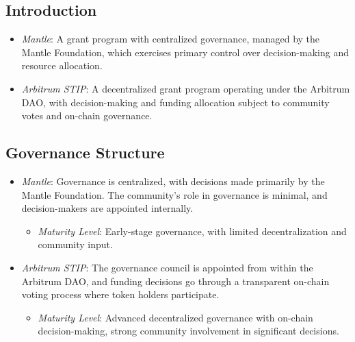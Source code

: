 \documentclass[a4,10pt]{article}
\begin{document}
\subsection{Introduction}\label{sec_15.1}

\begin{itemize}
    \item \textit{Mantle}: A grant program with centralized governance, managed by the Mantle Foundation, which exercises primary control over decision-making and resource allocation.
    \item \textit{Arbitrum STIP}: A decentralized grant program operating under the Arbitrum DAO, with decision-making and funding allocation subject to community votes and on-chain governance.
\end{itemize}

\subsection{Governance Structure}\label{sec_15.2}
\begin{itemize}
    \item \textit{Mantle}: Governance is centralized, with decisions made primarily by the Mantle Foundation. The community’s role in governance is minimal, and decision-makers are appointed internally.
    \begin{itemize}
        \item \textit{Maturity Level}: Early-stage governance, with limited decentralization and community input.
    \end{itemize}
    \item \textit{Arbitrum STIP}: The governance council is appointed from within the Arbitrum DAO, and funding decisions go through a transparent on-chain voting process where token holders participate.
    \begin{itemize}
        \item \textit{Maturity Level}: Advanced decentralized governance with on-chain decision-making, strong community involvement in significant decisions.
    \end{itemize}
\end{itemize}
\end{document}

